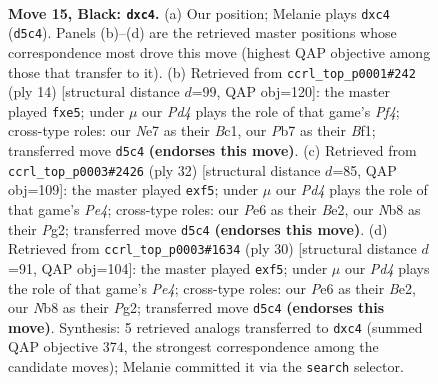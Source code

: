 \documentclass[11pt]{article}
\begin{document}
\clearpage

\begin{figure}[p]\centering
\begin{subfigure}{0.46\textwidth}\centering
\resizebox{\linewidth}{!}{%
\newchessgame
\chessboard[
  setfen={rnb1r3/1p1qnpkp/4p3/p1PpP1P1/2P2P2/P7/2P5/R1BQKBNR b KQ - 0 15},
  showmover=false,
  pgfstyle=straightmove, color=movearrow, markmove={d5-c4}
]}
\caption{}
\end{subfigure}\hfill
\begin{subfigure}{0.46\textwidth}\centering
\resizebox{\linewidth}{!}{%
\newchessgame
\chessboard[
  setfen={rnbqk1nr/pp4bp/4p1p1/2pPpp2/2P2P2/2N5/PP4PP/R1BQKBNR w KQkq - 0 8},
  showmover=false,
  pgfstyle=straightmove, color=movearrow, markmove={f4-e5}
]}
\caption{}
\end{subfigure}
\\[4pt]
\begin{subfigure}{0.46\textwidth}\centering
\resizebox{\linewidth}{!}{%
\newchessgame
\chessboard[
  setfen={2b1kb1r/1q3p1p/p2pp3/5p2/1r2PP2/1PNR1Q2/2P1B1PP/2K4R w k - 0 17},
  showmover=false,
  pgfstyle=straightmove, color=movearrow, markmove={e4-f5}
]}
\caption{}
\end{subfigure}\hfill
\begin{subfigure}{0.46\textwidth}\centering
\resizebox{\linewidth}{!}{%
\newchessgame
\chessboard[
  setfen={2b1kb1r/5p1p/p1qpp3/5p2/1r2PP2/2NR1Q2/1PP1B1PP/2K4R w k - 0 16},
  showmover=false,
  pgfstyle=straightmove, color=movearrow, markmove={e4-f5}
]}
\caption{}
\end{subfigure}
\caption{\textbf{Move 15, Black: \texttt{dxc4}.} (a) Our position; Melanie plays \texttt{dxc4} (\texttt{d5c4}). Panels (b)--(d) are the retrieved master positions whose correspondence most drove this move (highest QAP objective among those that transfer to it). (b) Retrieved from \texttt{ccrl\_top\_p0001\#242} (ply 14) [structural distance $d$=99, QAP obj=120]: the master played \texttt{fxe5}; under $\mu$ our \emph{Pd4} plays the role of that game's \emph{Pf4}; cross-type roles: our \emph{N}e7 as their \emph{B}c1, our \emph{P}b7 as their \emph{B}f1; transferred move \texttt{d5c4} \textbf{(endorses this move)}. (c) Retrieved from \texttt{ccrl\_top\_p0003\#2426} (ply 32) [structural distance $d$=85, QAP obj=109]: the master played \texttt{exf5}; under $\mu$ our \emph{Pd4} plays the role of that game's \emph{Pe4}; cross-type roles: our \emph{P}e6 as their \emph{B}e2, our \emph{N}b8 as their \emph{P}g2; transferred move \texttt{d5c4} \textbf{(endorses this move)}. (d) Retrieved from \texttt{ccrl\_top\_p0003\#1634} (ply 30) [structural distance $d$=91, QAP obj=104]: the master played \texttt{exf5}; under $\mu$ our \emph{Pd4} plays the role of that game's \emph{Pe4}; cross-type roles: our \emph{P}e6 as their \emph{B}e2, our \emph{N}b8 as their \emph{P}g2; transferred move \texttt{d5c4} \textbf{(endorses this move)}. Synthesis: 5 retrieved analogs transferred to \texttt{dxc4} (summed QAP objective 374, the strongest correspondence among the candidate moves); Melanie committed it via the \texttt{search} selector.}
\label{fig:thought-m29}
\end{figure}
\end{document}
